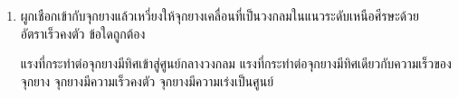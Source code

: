 \begin{enumerate}
	\item \runningj \nonet ผูกเชือกเข้ากับจุกยางแล้วเหวี่ยงให้จุกยางเคลื่อนที่เป็นวงกลมในแนวระดับเหนือศีรษะด้วยอัตราเร็วคงตัว  ข้อใดถูกต้อง
	\begin{1c}
		{แรงที่กระทําต่อจุกยางมีทิศเข้าสู่ศูนย์กลางวงกลม }
		{แรงที่กระทําต่อจุกยางมีทิศเดียวกับความเร็วของจุกยาง}
		{จุกยางมีความเร็วคงตัว}
		{จุกยางมีความเร่งเป็นศูนย์}
	\end{1c}
\end{enumerate}
